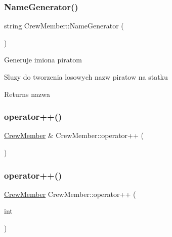 \mbox{\label{class_crew_member_a3b22e0361d970a65120f4f83be61a506}} 
\subsubsection{\texorpdfstring{Name\+Generator()}{NameGenerator()}}
{\footnotesize\ttfamily string Crew\+Member\+::\+Name\+Generator (\begin{DoxyParamCaption}{ }\end{DoxyParamCaption})}

Generuje imiona piratom

Sluzy do tworzenia losowych nazw piratow na statku \begin{DoxyReturn}{Returns}
nazwa 
\end{DoxyReturn}
\mbox{\label{class_crew_member_a6421e136cb395d24d3b7bcff7445decf}} 
\subsubsection{\texorpdfstring{operator++()}{operator++()}\hspace{0.1cm}{\footnotesize\ttfamily [1/2]}}
{\footnotesize\ttfamily \hyperlink{class_crew_member}{Crew\+Member} \& Crew\+Member\+::operator++ (\begin{DoxyParamCaption}{ }\end{DoxyParamCaption})}

\mbox{\label{class_crew_member_a28fa041c3e2e9407dcfefb0a3c072c66}} 
\subsubsection{\texorpdfstring{operator++()}{operator++()}\hspace{0.1cm}{\footnotesize\ttfamily [2/2]}}
{\footnotesize\ttfamily \hyperlink{class_crew_member}{Crew\+Member} Crew\+Member\+::operator++ (\begin{DoxyParamCaption}\item[{int}]{ }\end{DoxyParamCaption})}

